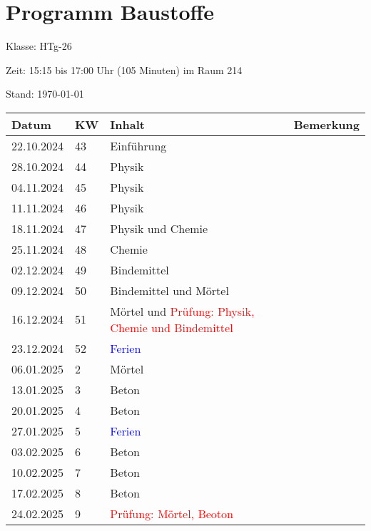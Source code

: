 \documentclass[
11pt,
captions=tableheading,
headings=big,
headsepline,
footsepline, 
captions=tableheading,
parskip=half-,
]{scrartcl}
\title{\fach}
\date{2024}
\newcommand{\klasse}{HTg-26\xspace}
\newcommand{\red}[1]{\textcolor{red}{#1}}
\begin{document}
\section*{Programm Baustoffe}

Klasse: \klasse

Zeit: 15:15 bis 17:00 Uhr (105 Minuten) im Raum 214



Stand: \today

\vspace{1cm}



\begin{table}[H]
    \centering
    \begin{tabular}{llp{8cm}p{4cm}}
    \toprule
    Datum & KW  & Inhalt & Bemerkung \\
    \midrule
        22.10.2024 & 43 & Einführung & {} \\
        28.10.2024 & 44 & Physik& {} \\
        04.11.2024 & 45 & Physik & {} \\
        11.11.2024 & 46 & Physik & {} \\
        18.11.2024 & 47 & Physik und Chemie & {} \\
        25.11.2024 & 48 & Chemie & {} \\
        02.12.2024 & 49 & Bindemittel& {} \\
        09.12.2024 & 50 & Bindemittel und Mörtel & {} \\
        16.12.2024 & 51 & Mörtel und \red{Prüfung: Physik, Chemie und Bindemittel} & {} \\
        23.12.2024 & 52 & \textcolor{blue}{Ferien} \\
        06.01.2025 & 2 & Mörtel & {} \\
        13.01.2025 & 3 & Beton & {} \\
        20.01.2025 & 4 & Beton & {} \\
        27.01.2025 & 5 & \textcolor{blue}{Ferien} & {} \\
        03.02.2025 & 6 & Beton& {} \\
        10.02.2025 & 7 & Beton& {} \\
        17.02.2025 & 8 & Beton & {} \\
        24.02.2025 & 9 & \red{Prüfung: Mörtel, Beoton}& {}\\
    \bottomrule
    \end{tabular}
\end{table}
\end{document}
